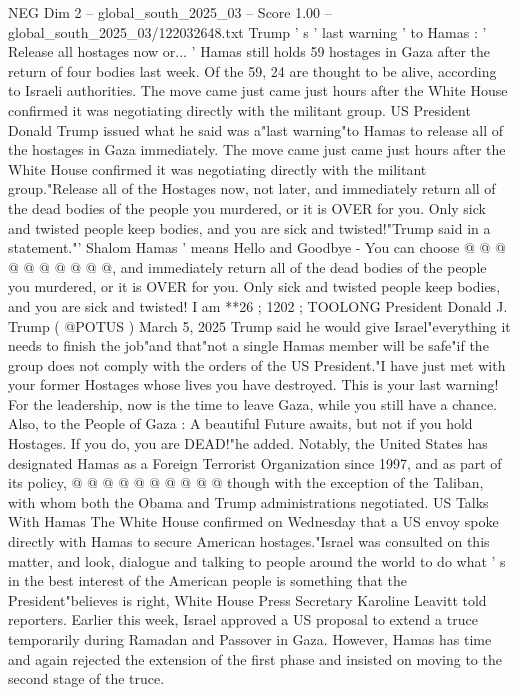\begin{textsample}{NEG Dim 2 – global\_south\_2025\_03 – Score 1.00 – global\_south\_2025\_03/122032648.txt}  \label{ex:f2_neg_145}
Trump ' s ' last warning ' to Hamas : ' Release all hostages now or... ' Hamas still holds 59 hostages in Gaza after the return of four bodies last week.
Of the 59, 24 are thought to be alive, according to Israeli authorities.
The move came just came just hours after the White House confirmed it was negotiating directly with the militant group.
US President Donald Trump issued what he said was a"last warning"to Hamas to release all of the hostages in Gaza immediately.
The move came just came just hours after the White House confirmed it was negotiating directly with the militant group."Release all of the Hostages now, not later, and immediately return all of the dead bodies of the people you murdered, or it is OVER for you.
Only sick and twisted people keep bodies, and you are sick and twisted!"Trump said in a statement."' Shalom Hamas ' means Hello and Goodbye - You can choose @ @ @ @ @ @ @ @ @ @, and immediately return all of the dead bodies of the people you murdered, or it is OVER for you.
Only sick and twisted people keep bodies, and you are sick and twisted!
I am **26 ; 1202 ; TOOLONG President Donald J.
Trump ( @POTUS ) March 5, 2025 Trump said he would give Israel"everything it needs to finish the job"and that"not a single Hamas member will be safe"if the group does not comply with the orders of the US President."I have just met with your former Hostages whose lives you have destroyed.
This is your last warning!
For the leadership, now is the time to leave Gaza, while you still have a chance.
Also, to the People of Gaza : A beautiful Future awaits, but not if you hold Hostages.
If you do, you are DEAD!"he added.
Notably, the United States has designated Hamas as a Foreign Terrorist Organization since 1997, and as part of its policy, @ @ @ @ @ @ @ @ @ @ though with the exception of the Taliban, with whom both the Obama and Trump administrations negotiated.
US Talks With Hamas The White House confirmed on Wednesday that a US envoy spoke directly with Hamas to secure American hostages."Israel was consulted on this matter, and look, dialogue and talking to people around the world to do what ' s in the best interest of the American people is something that the President"believes is right, White House Press Secretary Karoline Leavitt told reporters.
Earlier this week, Israel approved a US proposal to extend a truce temporarily during Ramadan and Passover in Gaza.
However, Hamas has time and again rejected the extension of the first phase and insisted on moving to the second stage of the truce.

\end{textsample}
